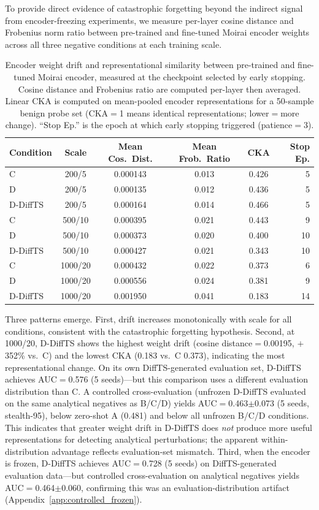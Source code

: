 To provide direct evidence of catastrophic forgetting beyond the indirect
signal from encoder-freezing experiments, we measure per-layer cosine
distance and Frobenius norm ratio between pre-trained and fine-tuned
Moirai encoder weights across all three negative conditions at each
training scale.

\begin{table}[h]
\centering
\small
\caption{
  Encoder weight drift and representational similarity between pre-trained and
  fine-tuned Moirai encoder, measured at the checkpoint selected by early stopping.
  Cosine distance and Frobenius ratio are computed per-layer then averaged.
  Linear CKA is computed on mean-pooled encoder representations for a 50-sample
  benign probe set (CKA$=$1 means identical representations; lower$=$more change).
  ``Stop Ep.'' is the epoch at which early stopping triggered (patience$=$3).
}
\label{tab:weight_drift}
\begin{tabular}{lccccr}
\toprule
Condition & Scale & Mean Cos.\ Dist. & Mean Frob.\ Ratio & CKA & Stop Ep. \\
\midrule
C        & 200/5   & 0.000143 & 0.013 & 0.426 & 5 \\
D        & 200/5   & 0.000135 & 0.012 & 0.436 & 5 \\
D-DiffTS & 200/5   & 0.000164 & 0.014 & 0.466 & 5 \\
C        & 500/10  & 0.000395 & 0.021 & 0.443 & 9 \\
D        & 500/10  & 0.000373 & 0.020 & 0.400 & 10 \\
D-DiffTS & 500/10  & 0.000427 & 0.021 & 0.343 & 10 \\
C        & 1000/20 & 0.000432 & 0.022 & 0.373 & 6 \\
D        & 1000/20 & 0.000556 & 0.024 & 0.381 & 9 \\
D-DiffTS & 1000/20 & 0.001950 & 0.041 & 0.183 & 14 \\
\bottomrule
\end{tabular}
\end{table}

Three patterns emerge.
First, drift increases monotonically with scale for all conditions, consistent
with the catastrophic forgetting hypothesis.
Second, at 1000/20, D-DiffTS shows the highest weight drift (cosine
distance$=$0.00195, $+$352\% vs.\ C) and the lowest CKA (0.183 vs.\ C 0.373),
indicating the most representational change.
On its own DiffTS-generated evaluation set, D-DiffTS achieves AUC$=$0.576
(5 seeds)---but this comparison uses a different evaluation distribution than C.
A controlled cross-evaluation (unfrozen D-DiffTS evaluated on the same
analytical negatives as B/C/D) yields AUC$=$0.463$\pm$0.073 (5 seeds,
stealth-95), below zero-shot A (0.481) and below all unfrozen B/C/D conditions.
This indicates that greater weight drift in D-DiffTS does \emph{not} produce
more useful representations for detecting analytical perturbations; the
apparent within-distribution advantage reflects evaluation-set mismatch.
Third, when the encoder is frozen, D-DiffTS achieves AUC$=$0.728 (5 seeds)
on DiffTS-generated evaluation data---but controlled cross-evaluation on
analytical negatives yields AUC$=$0.464$\pm$0.060, confirming this was an
evaluation-distribution artifact (Appendix~\ref{app:controlled_frozen}).

